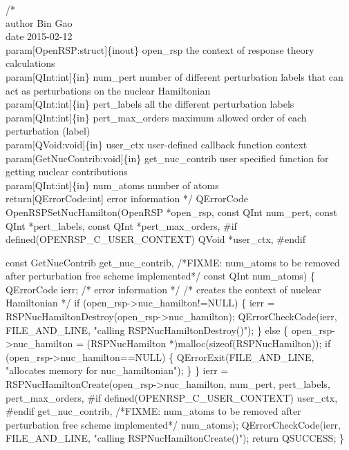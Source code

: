 /*%
    \\author Bin Gao
    \\date 2015-02-12
    \\param[OpenRSP:struct]\{inout\} open_rsp the context of response theory calculations
     \\param[QInt:int]\{in\} num_pert number of different perturbation labels that can
         act as perturbations on the nuclear Hamiltonian
     \\param[QInt:int]\{in\} pert_labels all the different perturbation labels
     \\param[QInt:int]\{in\} pert_max_orders maximum allowed order of each perturbation (label)
    \\param[QVoid:void]\{in\} user_ctx user-defined callback function context
    \\param[GetNucContrib:void]\{in\} get_nuc_contrib user specified function for
        getting nuclear contributions
    \\param[QInt:int]\{in\} num_atoms number of atoms
    \\return[QErrorCode:int] error information
*/
QErrorCode OpenRSPSetNucHamilton(OpenRSP *open_rsp,
                                 const QInt num_pert,
                                 const QInt *pert_labels,
                                 const QInt *pert_max_orders,
#if defined(OPENRSP_C_USER_CONTEXT)
                                 QVoid *user_ctx,
#endif

                                 const GetNucContrib get_nuc_contrib,
/*FIXME: num_atoms to be removed after perturbation free scheme implemented*/
                                 const QInt num_atoms)
\{
    QErrorCode ierr;  /* error information */
    /* creates the context of nuclear Hamiltonian */
    if (open_rsp->nuc_hamilton!=NULL) \{
        ierr = RSPNucHamiltonDestroy(open_rsp->nuc_hamilton);
        QErrorCheckCode(ierr, FILE_AND_LINE, "calling RSPNucHamiltonDestroy()");
    \}
    else \{
        open_rsp->nuc_hamilton = (RSPNucHamilton *)malloc(sizeof(RSPNucHamilton));
        if (open_rsp->nuc_hamilton==NULL) \{
            QErrorExit(FILE_AND_LINE, "allocates memory for nuc_hamiltonian");
        \}
    \}
    ierr = RSPNucHamiltonCreate(open_rsp->nuc_hamilton,
                                num_pert,
                                pert_labels,
                                pert_max_orders,
#if defined(OPENRSP_C_USER_CONTEXT)
                                user_ctx,
#endif
                                get_nuc_contrib,
/*FIXME: num_atoms to be removed after perturbation free scheme implemented*/
                                num_atoms);
    QErrorCheckCode(ierr, FILE_AND_LINE, "calling RSPNucHamiltonCreate()");
    return QSUCCESS;
\}
\nwendcode{}\nwdocspar


